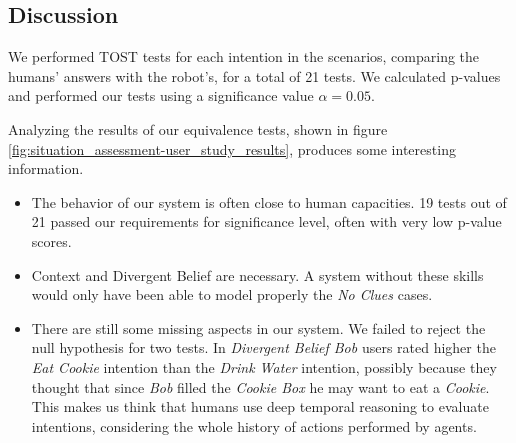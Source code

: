 \subsection{Discussion}
\label{sec:discussion}
We performed TOST tests for each intention in the scenarios, comparing the humans' answers with the robot's, for a total of 21 tests. We calculated p-values and performed our tests using a significance value $\alpha=0.05$.

Analyzing the results of our equivalence tests, shown in figure \ref{fig:situation_assessment-user_study_results}, produces some interesting information.
\begin{itemize}
\item The behavior of our system is often close to human capacities. 19 tests out of 21 passed our requirements for significance level, often with very low p-value scores. 
\item Context and Divergent Belief are necessary. A system without these skills would only have been able to model properly the \textit{No Clues} cases. 
\item There are still some missing aspects in our system. We failed to reject the null hypothesis for two tests. In \textit{Divergent Belief Bob} users rated higher the \textit{Eat Cookie} intention than the \textit{Drink Water} intention, possibly because they thought that since \textit{Bob} filled the \textit{Cookie Box} he may want to eat a \textit{Cookie}. This makes us think that humans use deep temporal reasoning to evaluate intentions, considering the whole history of actions performed by agents.  
\end{itemize}
